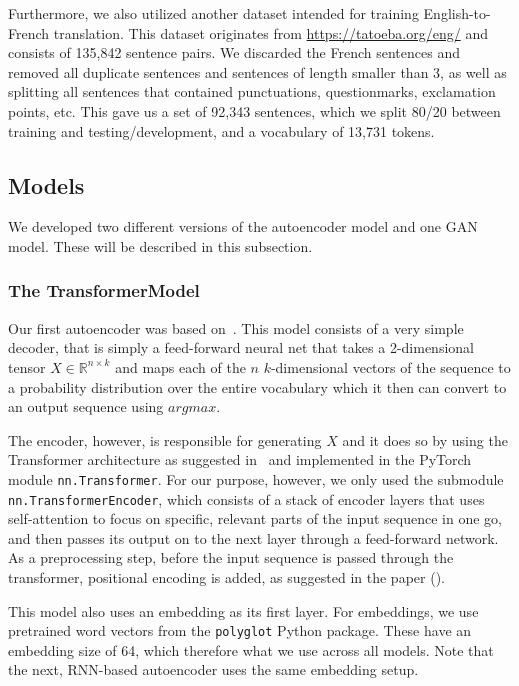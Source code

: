 \documentclass{article}
\begin{document}
Furthermore, we also utilized another dataset intended for training
English-to-French translation. This dataset originates from
\url{https://tatoeba.org/eng/} and consists of 135,842 sentence pairs. We
discarded the French sentences and removed all duplicate sentences and sentences
of length smaller than 3, as well as splitting all sentences that contained
punctuations, questionmarks, exclamation points, etc. This gave us a set of
92,343 sentences, which we split 80/20 between training and testing/development,
and a vocabulary of 13,731 tokens.


\subsection{Models}\label{sec:models}

We developed two different versions of the autoencoder model and one GAN model.
These will be described in this subsection.

\subsubsection{The TransformerModel}\label{sec:transformermodel}

Our first autoencoder was based on~\cite{pytorchTutorialTransformer}. This model
consists of a very simple decoder, that is simply a feed-forward neural net that
takes a 2-dimensional tensor $X \in \mathbb{R}^{n \times k}$ and maps each of
the $n$ $k$-dimensional vectors of the sequence to a probability distribution
over the entire vocabulary which it then can convert to an output sequence using
$argmax$.

The encoder, however, is responsible for generating $X$ and it does so by using
the Transformer architecture as suggested in~\cite{vaswani2017attention} and
implemented in the PyTorch module \texttt{nn.Transformer}. For our purpose,
however, we only used the submodule \texttt{nn.TransformerEncoder}, which
consists of a stack of encoder layers that uses self-attention to focus on
specific, relevant parts of the input sequence in one go, and then passes its
output on to the next layer through a feed-forward network. As a preprocessing
step, before the input sequence is passed through the transformer, positional
encoding is added, as suggested in the paper (\cite{vaswani2017attention}).

This model also uses an embedding as its first layer. For embeddings, we use
pretrained word vectors from the \texttt{polyglot} Python package. These have an
embedding size of 64, which therefore what we use across all models. Note that
the next, RNN-based autoencoder uses the same embedding setup.
\end{document}
